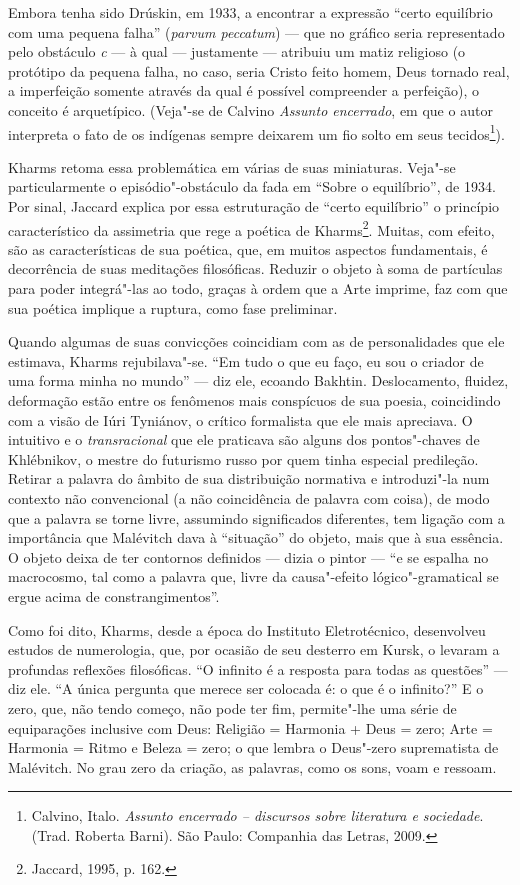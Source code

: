 Embora tenha sido Drúskin, em 1933, a encontrar a expressão ``certo
equilíbrio com uma pequena falha'' (\emph{parvum peccatum}) --- que no
gráfico seria representado pelo obstáculo \emph{c} --- à qual ---
justamente --- atribuiu um matiz religioso (o protótipo da pequena falha,
no caso, seria Cristo feito homem, Deus tornado real, a imperfeição
somente através da qual é possível compreender a perfeição), o conceito
é arquetípico. (Veja"-se de Calvino \emph{Assunto
encerrado}, em que o autor interpreta o fato de os indígenas sempre
deixarem um fio solto em seus tecidos\footnote{Calvino, Italo. \emph{Assunto encerrado -- discursos sobre literatura
e sociedade}. (Trad. Roberta Barni). São Paulo: Companhia das Letras, 2009.}).

Kharms retoma essa problemática em várias de suas miniaturas. Veja"-se
particularmente o episódio"-obstáculo da fada em ``Sobre o equilíbrio'',
de 1934. Por sinal, Jaccard explica por essa estruturação de ``certo equilíbrio'' o princípio característico da
assimetria que rege a poética de Kharms\footnote{Jaccard, 1995, p. 162.}. Muitas, com efeito, são as
características de sua poética, que, em muitos aspectos fundamentais, é
decorrência de suas meditações filosóficas. Reduzir o objeto à soma de
partículas para poder integrá"-las ao todo, graças à ordem que a Arte
imprime, faz com que sua poética implique a ruptura, como fase
preliminar.

Quando algumas de suas convicções coincidiam com as de personalidades
que ele estimava, Kharms rejubilava"-se. ``Em tudo o que eu faço, eu sou
o criador de uma forma minha no mundo'' --- diz ele, ecoando Bakhtin.
Deslocamento, fluidez, deformação estão entre os fenômenos mais
conspícuos de sua poesia, coincidindo com a visão de Iúri Tyniánov, o
crítico formalista que ele mais apreciava. O intuitivo e o
\emph{transracional} que ele praticava são alguns dos pontos"-chaves de
Khlébnikov, o mestre do futurismo russo por quem tinha especial
predileção. Retirar a palavra do âmbito de sua distribuição normativa e
introduzi"-la num contexto não convencional (a não coincidência de
palavra com coisa), de modo que a palavra se torne livre, assumindo
significados diferentes, tem ligação com a importância que Malévitch
dava à ``situação'' do objeto, mais que à sua essência. O objeto deixa
de ter contornos definidos --- dizia o pintor --- ``e se espalha no
macrocosmo, tal como a palavra que, livre da causa"-efeito
lógico"-gramatical se ergue acima de constrangimentos''.

Como foi dito, Kharms, desde a época do Instituto Eletrotécnico,
desenvolveu estudos de numerologia, que, por ocasião de seu desterro em
Kursk, o levaram a profundas reflexões filosóficas. ``O infinito é a
resposta para todas as questões'' --- diz ele. ``A única pergunta que
merece ser colocada é: o que é o infinito?'' E o zero, que, não tendo
começo, não pode ter fim, permite"-lhe uma série de equiparações
inclusive com Deus: Religião = Harmonia + Deus = zero; Arte = Harmonia =
Ritmo e Beleza = zero; o que lembra o Deus"-zero suprematista de
Malévitch. No grau zero da criação, as palavras, como os sons, voam e
ressoam.

